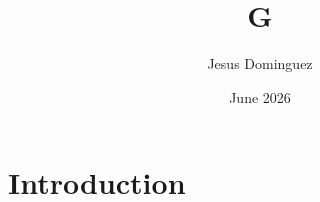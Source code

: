 \documentclass{article}
\title{G}
\author{Jesus Dominguez}
\date{June 2026}
\begin{document}
\maketitle

\section{Introduction}
\end{document}
